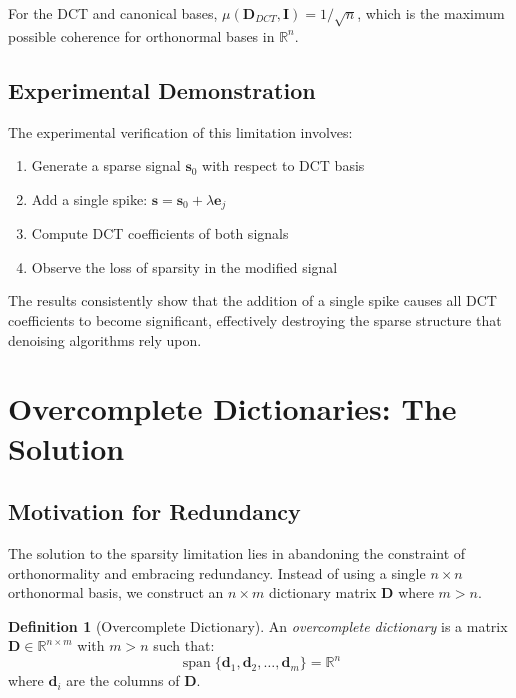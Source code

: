 \documentclass[12pt]{article}
\renewcommand{\vec}[1]{\mathbf{#1}}
\DeclareMathOperator{\spn}{span}
\newcommand{\R}{\mathbb{R}}
\theoremstyle{definition}
\newtheorem{definition}[theorem]{Definition}
\begin{document}
For the DCT and canonical bases, $\mu(\mathbf{D}_{DCT}, \mathbf{I}) = 1/\sqrt{n}$, which is the maximum possible coherence for orthonormal bases in $\R^n$.

\subsection{Experimental Demonstration}

The experimental verification of this limitation involves:

\begin{enumerate}
    \item Generate a sparse signal $\vec{s}_0$ with respect to DCT basis
    \item Add a single spike: $\vec{s} = \vec{s}_0 + \lambda \vec{e}_j$
    \item Compute DCT coefficients of both signals
    \item Observe the loss of sparsity in the modified signal
\end{enumerate}

The results consistently show that the addition of a single spike causes all DCT coefficients to become significant, effectively destroying the sparse structure that denoising algorithms rely upon.

\newpage

\section{Overcomplete Dictionaries: The Solution}

\subsection{Motivation for Redundancy}

The solution to the sparsity limitation lies in abandoning the constraint of orthonormality and embracing redundancy. Instead of using a single $n \times n$ orthonormal basis, we construct an $n \times m$ dictionary matrix $\mathbf{D}$ where $m > n$.

\begin{definition}[Overcomplete Dictionary]
    An \textit{overcomplete dictionary} is a matrix $\mathbf{D} \in \R^{n \times m}$ with $m > n$ such that:
    \begin{equation}
        \spn\{\vec{d}_1, \vec{d}_2, \ldots, \vec{d}_m\} = \R^n
    \end{equation}
    where $\vec{d}_i$ are the columns of $\mathbf{D}$.
\end{definition}
\end{document}
